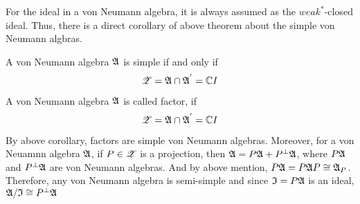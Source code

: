 For the ideal in a von Neumann algebra, it is always assumed as the $weak^*$-closed ideal. Thus, there is a direct corollary of above theorem about the simple von Neumann algbras.

\begin{cor}
		A von Neumann algebra $\mathfrak{A}$ is simple if and only if 
		\begin{equation*}
			\mathscr{Z} = \mathfrak{A} \cap \mathfrak{A}^{'} = \mathbb{C} I
		\end{equation*}
\end{cor}

\begin{defn}
	A von Neumann algebra $\mathfrak{A}$ is called factor, if 
	\begin{equation*}
		\mathscr{Z} = \mathfrak{A} \cap \mathfrak{A}^{'} = \mathbb{C} I
	\end{equation*}
\end{defn}
\begin{rem}
	By above corollary, factors are simple von Neumann algebras. Moreover, for a von Neuamnn algebra $\mathfrak{A}$,  if $P \in \mathscr{Z}$ is a projection, then $\mathfrak{A} = P \mathfrak{A} + P^{\bot} \mathfrak{A}$, where $P \mathfrak{A}$ and $P^{\bot} \mathfrak{A}$ are von Neumann algebras. And by above mention, $P \mathfrak{A} = P \mathfrak{A} P \cong \mathfrak{A}_P$. Therefore, any von Neumann algebra is semi-simple and since $\mathfrak{I} = P \mathfrak{A}$ is an ideal, $\mathfrak{A} / \mathfrak{I} \cong P^{\bot} \mathfrak{A}$
\end{rem}

